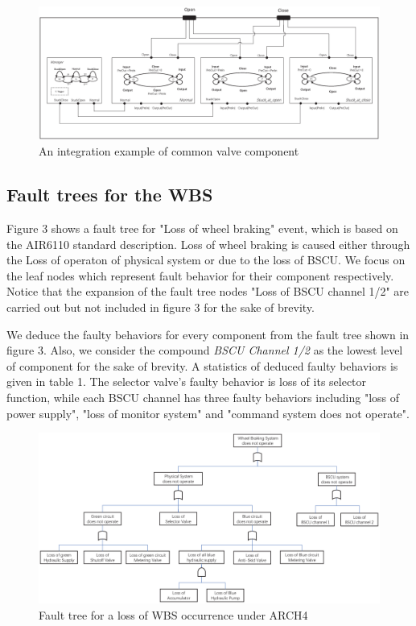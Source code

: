 \begin{figure}[htbp]
	\centerline{\includegraphics[width=165mm]{figure/Example.eps}}
	\caption{An integration example of common valve component}
	\label{Example}
\end{figure}

\subsection{Fault trees for the WBS}
Figure 3 shows a fault tree for "Loss of wheel braking" event, which is based on the AIR6110 standard description. Loss of wheel braking is caused either through the Loss of operaton of physical system or due to the loss of BSCU. We focus on the leaf nodes which represent fault behavior for their component respectively. Notice that the expansion of the fault tree nodes "Loss of BSCU channel 1/2" are carried out but not included in figure 3 for the sake of brevity.

We deduce the faulty behaviors for every component from the fault tree shown in figure 3. Also, we consider the compound \emph{BSCU Channel 1/2} as the lowest level of component for the sake of brevity. A statistics of deduced faulty behaviors is given in table 1. The selector valve's faulty behavior is loss of its selector function, while each BSCU channel has three faulty behaviors including "loss of power supply", "loss of monitor system" and "command system does not operate".

\begin{figure}[hb]
	\centerline{\includegraphics[width=165mm]{figure/fault_tree.eps}}
	\caption{Fault tree for a loss of WBS occurrence under ARCH4}
	\label{WBS_BIP_Nominal}
\end{figure}

